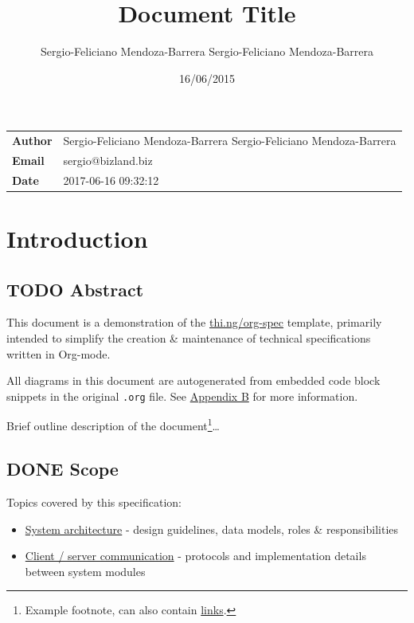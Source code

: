 \documentclass[letterpaper, 9pt, onecolumn, twoside, technote, final]{IEEEtran}
\author{Sergio-Feliciano Mendoza-Barrera Sergio-Feliciano Mendoza-Barrera}
\date{16/06/2015}
\title{Document Title}
\begin{document}
\maketitle
\begin{center}
\begin{tabular}{ll}
\textbf{Author} & Sergio-Feliciano Mendoza-Barrera Sergio-Feliciano Mendoza-Barrera\\
\textbf{Email} & sergio@bizland.biz\\
\textbf{Date} & 2017-06-16 09:32:12\\
\end{tabular}
\end{center}
\setcounter{tocdepth}{3}
\tableofcontents

\section{Introduction}
\label{sec:org9344e2c}

\subsection{{\bfseries\sffamily TODO} Abstract}
\label{sec:org863223b}

This document is a demonstration of the \href{https://github.com/thi-ng/org-spec}{thi.ng/org-spec} template,
primarily intended to simplify the creation \& maintenance of technical
specifications written in Org-mode.

All diagrams in this document are autogenerated from embedded code
block snippets in the original \texttt{.org} file. See \hyperref[sec:orgf273336]{Appendix B} for more
information.

Brief outline description of the document\footnote{Example footnote, can also contain \href{https://github.com/thi-ng/org-spec}{links}.}\ldots{}

\subsection{{\bfseries\sffamily DONE} Scope}
\label{sec:orge70993a}

Topics covered by this specification:

\begin{itemize}
\item \hyperref[sec:org5a7642a]{System architecture} - design guidelines, data models, roles \&
responsibilities
\item \hyperref[sec:orge25b676]{Client / server communication} - protocols and implementation details
between system modules
\end{itemize}
\end{document}

